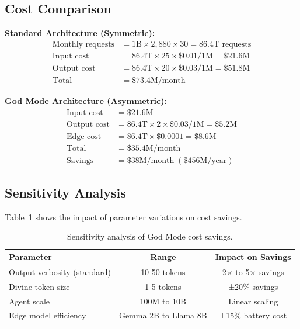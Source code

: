 \documentclass{article}
\begin{document}
\subsection{Cost Comparison}

\textbf{Standard Architecture (Symmetric):}
\begin{align}
\text{Monthly requests} &= 1\text{B} \times 2{,}880 \times 30 = 86.4\text{T requests} \\
\text{Input cost} &= 86.4\text{T} \times 25 \times \$0.01/1\text{M} = \$21.6\text{M} \\
\text{Output cost} &= 86.4\text{T} \times 20 \times \$0.03/1\text{M} = \$51.8\text{M} \\
\text{Total} &= \$73.4\text{M/month}
\end{align}

\textbf{God Mode Architecture (Asymmetric):}
\begin{align}
\text{Input cost} &= \$21.6\text{M} \\
\text{Output cost} &= 86.4\text{T} \times 2 \times \$0.03/1\text{M} = \$5.2\text{M} \\
\text{Edge cost} &= 86.4\text{T} \times \$0.0001 = \$8.6\text{M} \\
\text{Total} &= \$35.4\text{M/month} \\
\text{Savings} &= \$38\text{M/month} \;(\$456\text{M/year})
\end{align}

\subsection{Sensitivity Analysis}

Table~\ref{tab:sensitivity} shows the impact of parameter variations on cost savings.

\begin{table}[h]
\centering
\begin{tabular}{lcc}
\toprule
\textbf{Parameter} & \textbf{Range} & \textbf{Impact on Savings} \\
\midrule
Output verbosity (standard) & 10-50 tokens & 2× to 5× savings \\
Divine token size & 1-5 tokens & ±20\% savings \\
Agent scale & 100M to 10B & Linear scaling \\
Edge model efficiency & Gemma 2B to Llama 8B & ±15\% battery cost \\
\bottomrule
\end{tabular}
\caption{Sensitivity analysis of God Mode cost savings.}
\label{tab:sensitivity}
\end{table}
\end{document}
